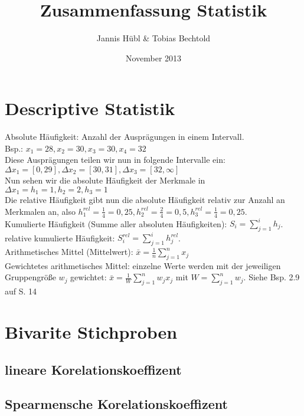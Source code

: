 \documentclass[a4paper, 11pt]{article}
\author{Jannis Hübl & Tobias Bechtold}
\title{Zusammenfassung Statistik}
\date{November 2013}
\begin{document}
\maketitle
\newpage
\tableofcontents

\section{Descriptive Statistik}
Absolute Häufigkeit: Anzahl der Ausprägungen in einem Intervall. \\
Bsp.: $x_1=28, x_2=30, x_3=30, x_4=32$ \\
\newline
Diese Ausprägungen teilen wir nun in folgende Intervalle ein: \\
$\Delta{x_1} = [0, 29], \Delta{x_2} = [30, 31], \Delta{x_3} = [32, \infty]$ \\
\newline
Nun sehen wir die absolute Häufigkeit der Merkmale in $\Delta{x_1} = h_1 = 1,
h_2 = 2, h_3 = 1$ \\
\newline
Die relative Häufigkeit gibt nun die absolute Häufigkeit relativ zur Anzahl an
Merkmalen an, also $h_1^{rel} = \frac{1}{4} = 0,25, h_2^{rel} = \frac{2}{4} =
0,5, h_3^{rel} = \frac{1}{4} = 0,25$. \\
\newline
Kumulierte Häufigkeit (Summe aller absoluten Häufigkeiten):
$S_i=\sum\nolimits_{j=1}^{i} h_j$.\\
relative kumulierte Häufigkeit: $S_i^{rel}=\sum\nolimits_{j=1}^{i} h_j^{rel}$.\\
\newline
Arithmetisches Mittel (Mittelwert): $\bar{x} = \frac{1}{n}
\sum\nolimits_{j=1}^{n} x_j$\\
\newline
Gewichtetes arithmetisches Mittel: einzelne Werte werden mit der jeweiligen
Gruppengröße $w_j$ gewichtet: $\bar{x}=\frac{1}{W}\sum\nolimits_{j=1}^{n}w_j
x_j$ mit $W=\sum\nolimits_{j=1}^{n} w_j$. Siehe Bsp. 2.9 auf S. 14
\newline
\section{Bivarite Stichproben}
\subsection{lineare Korelationskoeffizent}
\subsection{Spearmensche Korelationskoeffizent}
\end{document}
